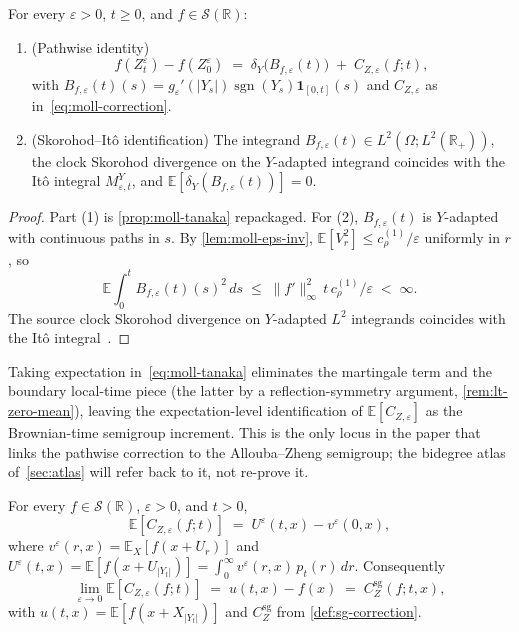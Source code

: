 \documentclass[EJP]{ejpecp}
\newcommand{\R}{\mathbb{R}}
\renewcommand{\E}{\mathbb{E}}
\newcommand{\IBM}{Z}
\DeclareMathOperator{\sgn}{sgn}
\begin{document}
\begin{theorem}
\label{thm:moll-ito}
For every $\varepsilon>0$, $t\ge 0$, and $f\in\mathscr S(\R)$:
\begin{enumerate}
\item (Pathwise identity)
\[
  f(\IBM_t^{\varepsilon})-f(\IBM_0^{\varepsilon})
  \;=\;\delta_Y\bigl(B_{f,\varepsilon}(t)\bigr)
       \;+\;C_{\IBM,\varepsilon}(f;t),
\]
with $B_{f,\varepsilon}(t)(s)=g_\varepsilon'(|Y_s|)\sgn(Y_s)\mathbf 1_{[0,t]}(s)$
and $C_{\IBM,\varepsilon}$ as in~\eqref{eq:moll-correction}.
\item (Skorohod--It\^o identification) The integrand
$B_{f,\varepsilon}(t)\in L^{2}(\Omega;L^{2}(\R_{+}))$, the clock
Skorohod divergence on the $Y$-adapted integrand coincides with the
It\^o integral $M_{\varepsilon,t}^{Y}$, and
$\E[\delta_Y(B_{f,\varepsilon}(t))]=0$.
\end{enumerate}
\end{theorem}

\begin{proof}
Part (1) is \cref{prop:moll-tanaka} repackaged. For (2),
$B_{f,\varepsilon}(t)$ is $Y$-adapted with continuous paths in $s$.
By \cref{lem:moll-eps-inv},
$\E[V_r^{2}]\le c_\rho^{(1)}/\varepsilon$ uniformly in $r$, so
\[
  \E\!\int_0^{t}B_{f,\varepsilon}(t)(s)^{2}\,ds
   \;\le\;\|f'\|_\infty^{2}\,t\,c_\rho^{(1)}/\varepsilon\;<\;\infty.
\]
The source clock Skorohod divergence on $Y$-adapted $L^{2}$
integrands coincides with the It\^o integral~\cite[Prop.~1.3.4]{Nualart}.
\end{proof}

Taking expectation in~\eqref{eq:moll-tanaka} eliminates the
martingale term and the boundary local-time piece (the latter by a
reflection-symmetry argument, \cref{rem:lt-zero-mean}), leaving the
expectation-level identification of $\E[C_{\IBM,\varepsilon}]$ as
the Brownian-time semigroup increment. This is the only locus in
the paper that links the pathwise correction to the
Allouba--Zheng semigroup; the bidegree atlas of~\cref{sec:atlas}
will refer back to it, not re-prove it.

\begin{theorem}
\label{thm:moll-consistency}
For every $f\in\mathscr S(\R)$, $\varepsilon>0$, and $t>0$,
\begin{equation}\label{eq:moll-exp-id}
  \E[C_{\IBM,\varepsilon}(f;t)]
   \;=\;U^\varepsilon(t,x)-v^\varepsilon(0,x),
\end{equation}
where $v^\varepsilon(r,x)=\E_X[f(x+U_r)]$ and
$U^\varepsilon(t,x)=\E[f(x+U_{|Y_t|})]
=\int_0^\infty v^\varepsilon(r,x)\,p_t(r)\,dr$. Consequently
\begin{equation}\label{eq:moll-limit}
  \lim_{\varepsilon\to 0}\E[C_{\IBM,\varepsilon}(f;t)]
   \;=\;u(t,x)-f(x)
   \;=\;C_\IBM^{\mathrm{sg}}(f;t,x),
\end{equation}
with $u(t,x)=\E[f(x+X_{|Y_t|})]$ and $C_\IBM^{\mathrm{sg}}$ from
\cref{def:sg-correction}.
\end{theorem}
\end{document}
